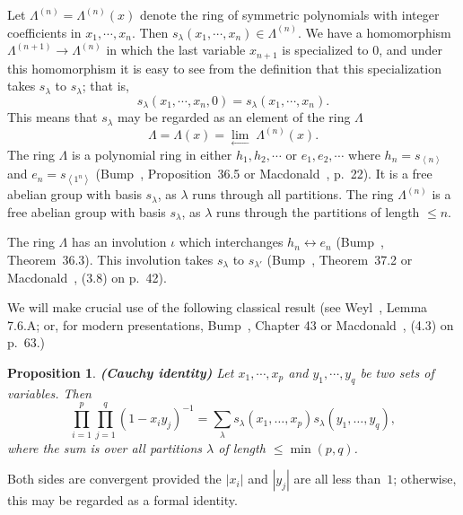 \documentclass[11pt]{amsart}
\newtheorem{proposition}{Proposition}
\newcommand{\dueto}[1]{\textup{\textbf{(#1) }}}
\begin{document}
Let $\Lambda^{( n )} = \Lambda^{( n )} ( x )$ denote the ring of
symmetric polynomials with integer coefficients in $x_1, \cdots,
x_n$. Then $s_{\lambda} ( x_1, \cdots, x_n ) \in \Lambda^{( n )}$.
We have a homomorphism $\Lambda^{( n + 1 )} \longrightarrow
\Lambda^{( n )}$ in which the last variable $x_{n + 1}$ is
specialized to $0$, and under this homomorphism it is easy to see
from the definition that this specialization takes $s_{\lambda}$
to $s_{\lambda}$; that is,
\begin{equation}
\label{ratiosschurspecialize} s_{\lambda} ( x_1, \cdots, x_n, 0 )
= s_{\lambda} ( x_1, \cdots, x_n ) .
\end{equation}
This means that $s_{\lambda}$ may be regarded as an element of the
ring $\Lambda$
\[ \Lambda = \Lambda ( x ) = \lim_{\longleftarrow} \; \Lambda^{( n )} ( x ) .
\]
The ring $\Lambda$ is a polynomial ring in either $h_1, h_2,
\cdots$ or $e_1, e_2, \cdots$ where $h_n = s_{\left\langle n
\right\rangle}$ and $e_n = s_{\left\langle 1^n \right\rangle}$
(Bump~{\cite{DB}}, Proposition~36.5 or Macdonald~{\cite{Mac}},
p.~22). It is a free abelian group with basis $s_{\lambda}$, as
$\lambda$ runs through all partitions. The ring $\Lambda^{( n )}$
is a free abelian group with basis $s_{\lambda}$, as $\lambda$
runs through the partitions of length $\leqslant n$.

The ring $\Lambda$ has an involution $\iota$ which interchanges
$h_n \longleftrightarrow e_n$ (Bump~{\cite{DB}}, Theorem~36.3).
This involution takes $s_{\lambda}$ to $s_{\lambda'}$
(Bump~{\cite{DB}}, Theorem~37.2 or Macdonald~{\cite{Mac}}, (3.8)
on p.~42).


We will make crucial use of the following classical result (see
Weyl~{\cite{weyl}}, Lemma 7.6.A;  or, for modern presentations,
Bump~{\cite{DB}}, Chapter 43 or Macdonald~{\cite{Mac}}, (4.3) on
p.~63.)

\begin{proposition}
{\dueto{Cauchy identity}}Let $x_1, \cdots, x_p$ and $y_1, \cdots,
y_q$ be two sets of variables. Then
\begin{equation}
   \label{ratioscauchy} \prod_{i = 1}^p \prod_{j = 1}^q ( 1 - x_i y_j )^{- 1}
   = \sum_{\lambda} s_{\lambda} ( x_1, \ldots, x_p ) s_{\lambda} ( y_1,
   \ldots, y_q ),
\end{equation}
where the sum is over all partitions $\lambda$ of length
$\leqslant \min ( p, q )$.
\end{proposition}

Both sides are convergent provided the $|x_i |$ and $|y_j |$ are
all less than~$1$; otherwise, this may be regarded as a formal
identity.
\end{document}
